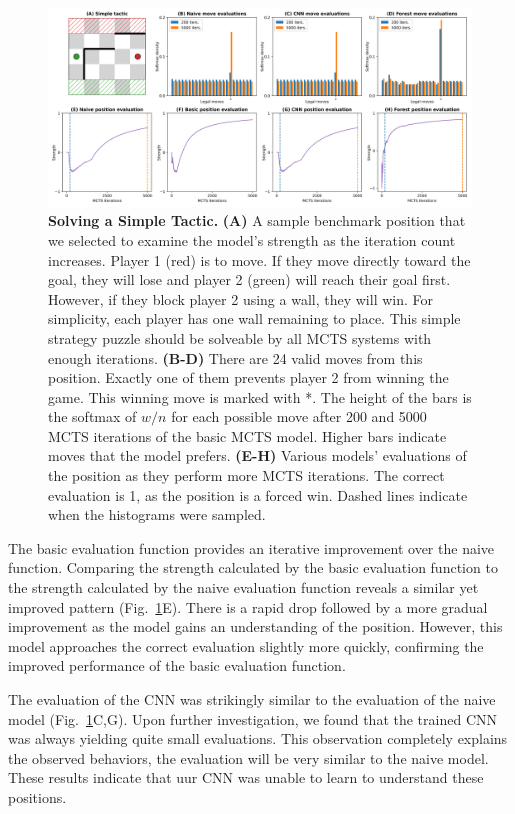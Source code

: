 \documentclass[10pt]{article}
\begin{document}
\begin{figure}[H]
    \centering
    \includegraphics[width=\linewidth]{MCTS_eval.png}
    \caption{\textbf{Solving a Simple Tactic.} \textbf{(A)} A sample benchmark position that we selected to examine the model's strength as the iteration count increases. Player 1 (red) is to move. If they move directly toward the goal, they will lose and player 2 (green) will reach their goal first. However, if they block player 2 using a wall, they will win. For simplicity, each player has one wall remaining to place. This simple strategy puzzle should be solveable by all MCTS systems with enough iterations. \textbf{(B-D)} There are 24 valid moves from this position. Exactly one of them prevents player 2 from winning the game. This winning move is marked with *. The height of the bars is the softmax of $w/n$ for each possible move after 200 and 5000 MCTS iterations of the basic MCTS model. Higher bars indicate moves that the model prefers. \textbf{(E-H)} Various models' evaluations of the position as they perform more MCTS iterations. The correct evaluation is 1, as the position is  a forced win. Dashed lines indicate when the histograms were sampled.}
    \label{fig:MCTS}
\end{figure}

The basic evaluation function provides an iterative improvement over the naive function. Comparing the strength calculated by the basic evaluation function to the strength calculated by the naive evaluation function reveals a similar yet improved pattern (Fig.~\ref{fig:MCTS}E). There is a rapid drop followed by a more gradual improvement as the model gains an understanding of the position. However, this model approaches the correct evaluation slightly more quickly, confirming the improved performance of the basic evaluation function.

The evaluation of the CNN was strikingly similar to the evaluation of the naive model (Fig.~\ref{fig:MCTS}C,G). Upon further investigation, we found that the trained CNN was always yielding quite small evaluations. This observation completely explains the observed behaviors, the evaluation will be very similar to the naive model. These results indicate that uur CNN was unable to learn to understand these positions.
\end{document}
